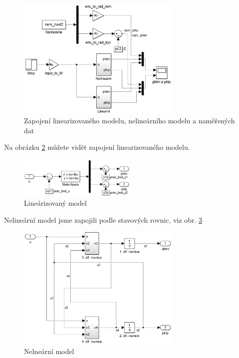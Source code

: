 \documentclass[11pt,a4paper]{article}
\begin{document}
\begin{figure}[H]
\centering
\includegraphics[width=0.7\textwidth]{schema_celku.jpg}
\caption{Zapojení linearizovaného modelu, nelineárního modelu a naměřených dat}
\label{model:celk}
\end{figure}

Na obrázku \ref{model:lin} můžete vidět zapojení linearizovaného modelu.

\begin{figure}[H]
\centering
\includegraphics[width=0.5\textwidth]{schema_linearizovany.jpg}
\caption{Lineárizovaný model}
\label{model:lin}
\end{figure}

Nelineární model jsme zapojili podle stavových rovnic, viz obr. \ref{model:nelin}
\begin{figure}[H]
\centering
\includegraphics[width=0.7\textwidth]{schema_nelinearni_celek.jpg}
\caption{Nelneární model}
\label{model:nelin}
\end{figure}
\end{document}
